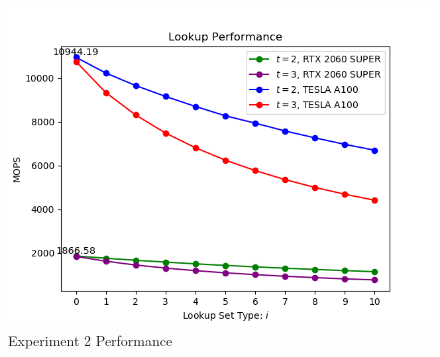 \documentclass[10pt,twocolumn,letterpaper]{article}
\begin{document}
\begin{figure}[h]
    \centering
    \includegraphics[scale=0.5]{figures/2.png}
    \caption{Experiment 2 Performance}
    \label{fig:experiment2}
\end{figure}
\end{document}
